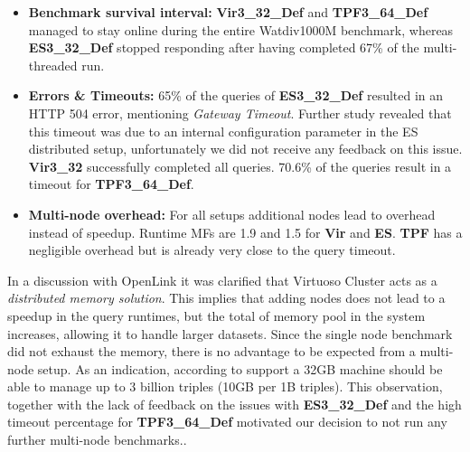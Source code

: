 \documentclass[twocolumn]{bmcart}%
\begin{document}
\begin{itemize}
	\item \textbf{Benchmark survival interval:} %
	\textbf{Vir3\_32\_Def} and \textbf{TPF3\_64\_Def} managed to stay online during the entire Watdiv1000M benchmark, whereas \textbf{ES3\_32\_Def} stopped responding after having completed 67\% of the multi-threaded run. 
	\item \textbf{Errors \& Timeouts:} 65\% of the queries of \textbf{ES3\_32\_Def} resulted in an HTTP 504 error, mentioning \textit{Gateway Timeout}. Further study revealed that this timeout was due to an internal configuration parameter in the ES distributed setup, unfortunately we did not receive any feedback on this issue. \textbf{Vir3\_32} successfully completed all queries. 70.6\% of the queries result in a timeout for \textbf{TPF3\_64\_Def}.
	\item \textbf{Multi-node overhead:} For all setups additional nodes lead to overhead instead of speedup. Runtime MFs are 1.9 and 1.5 for \textbf{Vir} and \textbf{ES}. \textbf{TPF} has a negligible overhead but is already very close to the query timeout.
\end{itemize}
%
%   

In a discussion with OpenLink it was clarified that Virtuoso Cluster acts as a \emph{distributed memory solution}. This implies that adding nodes does not lead to a speedup in the query runtimes, but the total of memory pool in the system increases, allowing it to handle larger datasets. Since the single node benchmark did not exhaust the memory, there is no advantage to be expected from a multi-node setup. As an indication, according to support a 32GB machine should be able to manage up to 3 billion triples (10GB per 1B triples). 
This observation, together with the lack of feedback on the issues with \textbf{ES3\_32\_Def} and the high timeout percentage for \textbf{TPF3\_64\_Def} motivated our decision to not run any further multi-node benchmarks..
\end{document}
